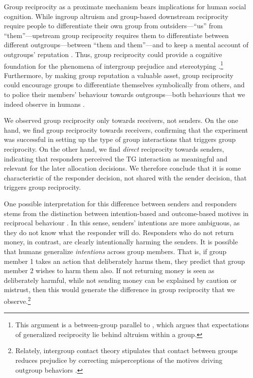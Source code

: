 \documentclass[12pt,a4paper]{article}\usepackage[]{graphicx}\usepackage[]{color}
\begin{document}
Group reciprocity as a proximate mechanism bears implications for human social cognition. While ingroup 
altruism and group-based downstream reciprocity require people to differentiate their own group from 
outsiders---``us'' from ``them''---upstream group reciprocity requires them to differentiate between 
different outgroups---between ``them and them''---and to keep a mental account of outgroups' 
reputation \citep[cf.][]{tooby2006cognitive}. Thus, group reciprocity could provide a cognitive foundation for the phenomena of 
intergroup prejudice and stereotyping \citep{allport1954nature}.\footnote{This argument is a 
between-group parallel to \citet{yamagishi2000thegroup}, which argues that expectations of 
generalized reciprocity lie behind altruism within a group.} Furthermore, by making group reputation
a valuable asset, group reciprocity could encourage groups to differentiate themselves symbolically
from others, and to police their members' behaviour towards outgroups---both behaviours that we indeed observe in humans \citep{fearon1996explaining}.

We observed group reciprocity only towards receivers, not senders. 
On the one hand, we find group reciprocity towards receivers, confirming that the experiment was successful in setting up the type of group interactions that triggers group reciprocity. On the other hand, we find \emph{direct} reciprocity towards senders, indicating that responders perceived the TG interaction as meaningful and relevant for the later allocation decisions. We therefore conclude that it is some characteristic of the responder decision, not shared with the sender decision, that triggers group reciprocity.

One possible interpretation for this difference between senders and responders stems from the distinction between intention-based and outcome-based motives in reciprocal behaviour \citep{falk2006theory,stanca2009testing}. In this sense, senders' intentions are more ambiguous, as they do not know what the responder will do. Responders who do not return money, in contrast, are clearly intentionally harming the senders.
It is possible that humans generalize \emph{intentions} across group members. That is, if group member 1 takes an action that deliberately harms them, they predict that group member 2 wishes to harm them also. If not returning money is seen as deliberately harmful, while
not sending money can be explained by caution or mistrust, then this would generate the difference in group reciprocity that we observe.\footnote{
Relately, intergroup contact theory stipulates that contact between groups reduces prejudice by correcting misperceptions of the motives driving outgroup behaviors \citep{pettigrew1998intergroup}. 
}
\end{document}
